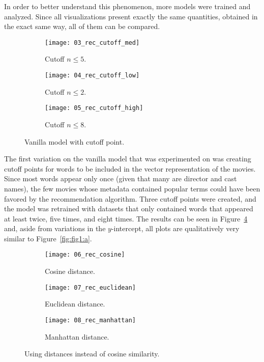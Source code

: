 In order to better understand this phenomenon, more models were trained and
analyzed. Since all visualizations present exactly the same quantities, obtained
in the exact same way, all of them can be compared.

\begin{figure}
  \centering
  \begin{subfigure}{0.3\textwidth}
    \centering
    \texttt{[image: 03\_rec\_cutoff\_med]}
    \caption{Cutoff $n \leqslant 5$.\label{fig:fig2:a}}
  \end{subfigure}
  \begin{subfigure}{0.3\textwidth}
    \centering
    \texttt{[image: 04\_rec\_cutoff\_low]}
    \caption{Cutoff $n \leqslant 2$.\label{fig:fig2:b}}
  \end{subfigure}
  \begin{subfigure}{0.3\textwidth}
    \centering
    \texttt{[image: 05\_rec\_cutoff\_high]}
    \caption{Cutoff $n \leqslant 8$.\label{fig:fig2:c}}
  \end{subfigure}
  \caption{Vanilla model with cutoff point.\label{fig:fig2}}
\end{figure}

The first variation on the vanilla model that was experimented on was creating
cutoff points for words to be included in the vector representation of the
movies. Since most words appear only once (given that many are director and cast
names), the few movies whose metadata contained popular terms could have been
favored by the recommendation algorithm. Three cutoff points were created, and
the model was retrained with datasets that only contained words that appeared at
least twice, five times, and eight times. The results can be seen in
Figure~\ref{fig:fig2} and, aside from variations in the $y$-intercept, all plots
are qualitatively very similar to Figure~\ref{fig:fig1:a}.

\begin{figure}
  \centering
  \begin{subfigure}{0.3\textwidth}
    \centering
    \texttt{[image: 06\_rec\_cosine]}
    \caption{Cosine distance.\label{fig:fig3:a}}
  \end{subfigure}
  \begin{subfigure}{0.3\textwidth}
    \centering
    \texttt{[image: 07\_rec\_euclidean]}
    \caption{Euclidean distance.\label{fig:fig3:b}}
  \end{subfigure}
  \begin{subfigure}{0.3\textwidth}
    \centering
    \texttt{[image: 08\_rec\_manhattan]}
    \caption{Manhattan distance.\label{fig:fig3:c}}
  \end{subfigure}
  \caption{Using distances instead of cosine similarity.\label{fig:fig3}}
\end{figure}

